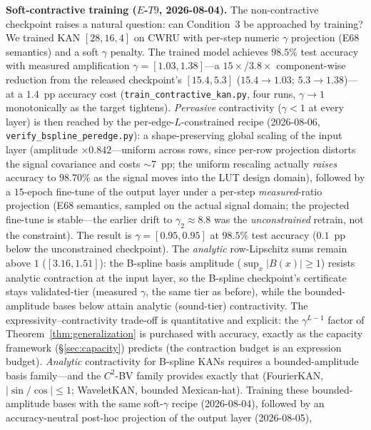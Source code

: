 \vspace{4pt}
\noindent\textbf{Soft-contractive training ($E$-$T9$, 2026-08-04).}
The non-contractive checkpoint raises a natural question: can
Condition~3 be approached by training?  We trained KAN $[28,16,4]$ on
CWRU with per-step numeric $\gamma$ projection (E68 semantics) and a
soft $\gamma$ penalty.  The trained model achieves $98.5\%$ test
accuracy with measured amplification $\gamma = [1.03, 1.38]$---a
$15\times$/$3.8\times$ component-wise reduction from the released
checkpoint's $[15.4, 5.3]$ ($15.4\to1.03$; $5.3\to1.38$)---at a $1.4$~pp
accuracy cost
(\texttt{train\_contractive\_kan.py}, four runs, $\gamma \to 1$
monotonically as the target tightens).  \emph{Pervasive}
contractivity ($\gamma < 1$ at every layer) is then reached by the
per-edge-$L$-constrained recipe (2026-08-06,
\texttt{verify\_bspline\_peredge.py}): a shape-preserving global
scaling of the input layer (amplitude $\times 0.842$---uniform across
rows, since per-row projection distorts the signal covariance and
costs $\sim$7~pp; the uniform rescaling actually \emph{raises}
accuracy to $98.70\%$ as the signal moves into the LUT design
domain), followed by a $15$-epoch fine-tune of the output layer under
a per-step \emph{measured}-ratio projection (E68 semantics, sampled
on the actual signal domain; the projected fine-tune is stable---the
earlier drift to $\gamma_2 \approx 8.8$ was the \emph{unconstrained}
retrain, not the constraint).  The result is $\gamma = [0.95, 0.95]$
at $98.5\%$ test accuracy ($0.1$~pp below the unconstrained
checkpoint).  The \emph{analytic} row-Lipschitz sums remain above
$1$ ($[3.16, 1.51]$): the B-spline basis amplitude
($\sup_x |B(x)| \geq 1$) resists analytic contraction at the input
layer, so the B-spline checkpoint's certificate stays
validated-tier (measured $\gamma$, the same tier as before), while
the bounded-amplitude bases below attain analytic (sound-tier)
contractivity.  The expressivity--contractivity
trade-off is quantitative and explicit: the $\gamma^{L-1}$ factor of
Theorem~\ref{thm:generalization} is purchased with accuracy, exactly
as the capacity framework ({\S}\ref{sec:capacity}) predicts (the
contraction budget is an expression budget).  \emph{Analytic}
contractivity for B-spline KANs requires a bounded-amplitude basis
family---and the $C^2$-BV family provides exactly that (FourierKAN,
$|\sin/\cos| \leq 1$; WaveletKAN, bounded Mexican-hat). Training these bounded-amplitude bases
with the same soft-$\gamma$ recipe (2026-08-04), followed by an
accuracy-neutral post-hoc projection of the output layer (2026-08-05),
